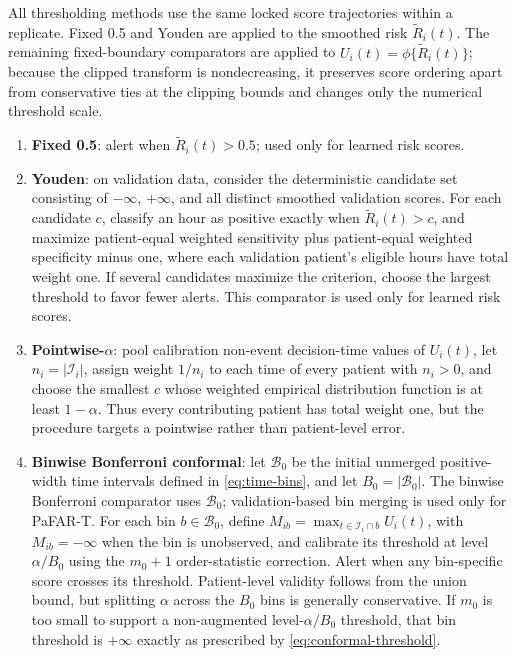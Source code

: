 \documentclass[11pt]{article}
\newcommand{\calI}{\mathcal{I}}
\begin{document}
All thresholding methods use the same locked score trajectories within a replicate. Fixed 0.5 and Youden are applied to the smoothed risk $\widetilde R_i(t)$. The remaining fixed-boundary comparators are applied to $U_i(t)=\phi\{\widetilde R_i(t)\}$; because the clipped transform is nondecreasing, it preserves score ordering apart from conservative ties at the clipping bounds and changes only the numerical threshold scale.
\begin{enumerate}
    \item \textbf{Fixed 0.5}: alert when $\widetilde R_i(t)>0.5$; used only for learned risk scores.
    \item \textbf{Youden}: on validation data, consider the deterministic candidate set consisting of $-\infty$, $+\infty$, and all distinct smoothed validation scores. For each candidate $c$, classify an hour as positive exactly when $\widetilde R_i(t)>c$, and maximize patient-equal weighted sensitivity plus patient-equal weighted specificity minus one, where each validation patient's eligible hours have total weight one. If several candidates maximize the criterion, choose the largest threshold to favor fewer alerts. This comparator is used only for learned risk scores.
    \item \textbf{Pointwise-$\alpha$}: pool calibration non-event decision-time values of $U_i(t)$, let $n_i=|\calI_i|$, assign weight $1/n_i$ to each time of every patient with $n_i>0$, and choose the smallest $c$ whose weighted empirical distribution function is at least $1-\alpha$. Thus every contributing patient has total weight one, but the procedure targets a pointwise rather than patient-level error.
    \item \textbf{Binwise Bonferroni conformal}: let $\mathcal B_0$ be the initial unmerged positive-width time intervals defined in \eqref{eq:time-bins}, and let $B_0=|\mathcal B_0|$. The binwise Bonferroni comparator uses $\mathcal B_0$; validation-based bin merging is used only for PaFAR-T. For each bin $b\in\mathcal B_0$, define $M_{ib}=\max_{t\in\calI_i\cap b}U_i(t)$, with $M_{ib}=-\infty$ when the bin is unobserved, and calibrate its threshold at level $\alpha/B_0$ using the $m_0+1$ order-statistic correction. Alert when any bin-specific score crosses its threshold. Patient-level validity follows from the union bound, but splitting $\alpha$ across the $B_0$ bins is generally conservative. If $m_0$ is too small to support a non-augmented level-$\alpha/B_0$ threshold, that bin threshold is $+\infty$ exactly as prescribed by \eqref{eq:conformal-threshold}.

\end{enumerate}
\end{document}

